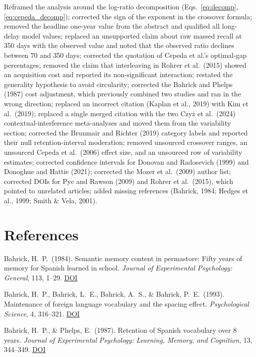 \documentclass[10pt,twocolumn]{article}
\begin{document}
\footnotesize
Reframed the analysis around the log-ratio decomposition (Eqs.~\ref{eq:decomp}, \ref{eq:cepeda_decomp}); corrected the sign of the exponent in the crossover formula; removed the headline one-year value from the abstract and qualified all long-delay model values; replaced an unsupported claim about raw massed recall at 350 days with the observed value and noted that the observed ratio declines between 70 and 350 days; corrected the quotation of Cepeda et al.'s optimal-gap percentages; removed the claim that interleaving in Rohrer et al.\ (2015) showed an acquisition cost and reported its non-significant interaction; restated the generality hypothesis to avoid circularity; corrected the Bahrick and Phelps (1987) cost adjustment, which previously combined two studies and ran in the wrong direction; replaced an incorrect citation (Kaplan et al., 2019) with Kim et al.\ (2019); replaced a single merged citation with the two Czy\.{z} et al.\ (2024) contextual-interference meta-analyses and moved them from the variability section; corrected the Brunmair and Richter (2019) category labels and reported their null retention-interval moderation; removed unsourced crossover ranges, an unsourced Cepeda et al.\ (2006) effect size, and an unsourced row of variability estimates; corrected confidence intervals for Donovan and Radosevich (1999) and Donoghue and Hattie (2021); corrected the Mozer et al.\ (2009) author list; corrected DOIs for Pyc and Rawson (2009) and Rohrer et al.\ (2015), which pointed to unrelated articles; added missing references (Bahrick, 1984; Hedges et al., 1999; Smith \& Vela, 2001).
\normalsize

\section*{References}
\small

\noindent Bahrick, H.\ P.\ (1984). Semantic memory content in permastore: Fifty years of memory for Spanish learned in school. \textit{Journal of Experimental Psychology: General}, 113, 1--29. \href{https://doi.org/10.1037/0096-3445.113.1.1}{DOI}

\noindent Bahrick, H.\ P., Bahrick, L.\ E., Bahrick, A.\ S., \& Bahrick, P.\ E.\ (1993). Maintenance of foreign language vocabulary and the spacing effect. \textit{Psychological Science}, 4, 316--321. \href{https://doi.org/10.1111/j.1467-9280.1993.tb00571.x}{DOI}

\noindent Bahrick, H.\ P., \& Phelps, E.\ (1987). Retention of Spanish vocabulary over 8 years. \textit{Journal of Experimental Psychology: Learning, Memory, and Cognition}, 13, 344--349. \href{https://doi.org/10.1037/0278-7393.13.2.344}{DOI}
\end{document}
